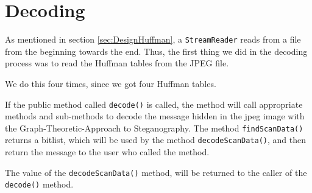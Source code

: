 \section{Decoding}
As mentioned in section \ref{sec:DesignHuffman}, a \lstinline|StreamReader| reads from a file from the beginning towards the end.
Thus, the first thing we did in the decoding process was to read the Huffman tables from the JPEG file. 

We do this four times, since we got four Huffman tables.

If the public method called \lstinline|decode()| is called, the method will call appropriate methods and sub-methods to decode the message hidden in the jpeg image with the Graph-Theoretic-Approach to Steganography.
The method \lstinline|findScanData()| returns a bitlist, which will be used by the method \lstinline|decodeScanData()|, and then return the message to the user who called the method.


The value of the \lstinline|decodeScanData()| method, will be returned to the caller of the \lstinline|decode()| method.
